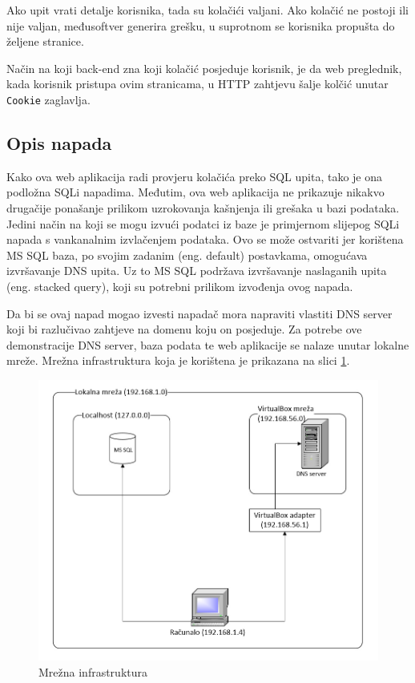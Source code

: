 \documentclass[12pt, oneside, onecolumn]{book}
\begin{document}
{Ako upit vrati detalje korisnika, tada su kolačići valjani. Ako kolačić ne postoji ili nije valjan, međusoftver generira grešku, u suprotnom se korisnika propušta do željene stranice.

Način na koji back-end zna koji kolačić posjeduje korisnik, je da web preglednik, kada korisnik pristupa ovim stranicama, u HTTP zahtjevu šalje kolčić unutar \texttt{Cookie} zaglavlja.

\subsection{Opis napada}
Kako ova web aplikacija radi provjeru kolačića preko SQL upita, tako je ona podložna SQLi napadima. Međutim, ova web aplikacija ne prikazuje nikakvo drugačije ponašanje prilikom uzrokovanja kašnjenja ili grešaka u bazi podataka. Jedini način na koji se mogu izvući podatci iz baze je primjernom slijepog SQLi napada s vankanalnim izvlačenjem podataka. Ovo se može ostvariti jer korištena MS SQL baza, po svojim zadanim (eng. default) postavkama, omogućava izvršavanje DNS upita. Uz to MS SQL podržava izvršavanje naslaganih upita (eng. stacked query), koji su potrebni prilikom izvođenja ovog napada.

Da bi se ovaj napad mogao izvesti napadač mora napraviti vlastiti DNS server koji bi razlučivao zahtjeve na domenu koju on posjeduje. Za potrebe ove demonstracije DNS server, baza podata te web aplikacije se nalaze unutar lokalne mreže. Mrežna infrastruktura koja je korištena je prikazana na slici \ref{fig:bsqli_arh}.

\begin{figure}[H]
	\begin{center}
		\includegraphics[width=\textwidth]{bsqli_arh.jpg}
		\caption{Mrežna infrastruktura} \label{fig:bsqli_arh}
	\end{center}
\end{figure}

}
\end{document}
